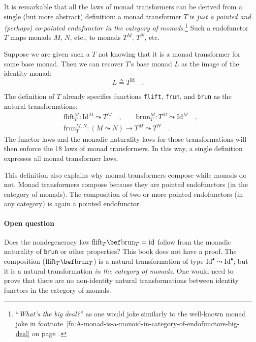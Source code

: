 It is remarkable that all the laws of monad transformers can be derived
from a single (but more abstract) definition: a monad transformer
$T$ is \emph{just a pointed and (perhaps) co-pointed endofunctor
in the category of monads}.\footnote{\textsf{``}\emph{What\textsf{'}s the big deal?}\textsf{''} as one\label{fn:Whats-the-big-deal-monad-transformers}
would joke similarly to the well-known monad joke in
footnote~\ref{fn:A-monad-is-a-monoid-in-category-of-endofunctors-big-deal}
on page~\pageref{fn:A-monad-is-a-monoid-in-category-of-endofunctors-big-deal}. } Such a endofunctor $T$ maps monads $M$, $N$, etc., to monads $T^{M}$,
$T^{N}$, etc. 

Suppose we are given such a $T$ not knowing that it is a monad transformer
for some base monad. Then we can recover $T$\textsf{'}s base monad $L$ as
the image of the identity monad:
\[
L\triangleq T^{\text{Id}}\quad.
\]

The definition of $T$ already specifies functions \lstinline!flift!,
\lstinline!frun!, and \lstinline!brun! as the natural transformations:
\begin{align*}
 & \text{flift}_{T}^{M}:\text{Id}^{M}\leadsto T^{M}\quad,\quad\quad\text{brun}_{T}^{M}:T^{M}\leadsto\text{Id}^{M}\quad,\\
 & \text{frun}_{T}^{M,N}:(M\leadsto N)\rightarrow T^{M}\leadsto T^{N}\quad.
\end{align*}
The functor laws and the monadic naturality laws for those transformations
will then enforce the 18 laws of monad transformers. In this way,
a single definition expresses all monad transformer laws.

This definition also explains why monad transformers compose while
monads do not. Monad transformers compose because they are pointed
endofunctors (in the category of monads). The composition of two or
more pointed endofunctors (in any category) is again a pointed endofunctor.

\paragraph{Open question\texttt{ }}

\label{par:Open-question-monad-id-trans}Does the nondegeneracy law
$\text{flift}_{T}\bef\text{brun}_{T}=\text{id}$ follow from the monadic
naturality of \lstinline!brun! or other properties? This book does
not have a proof. The composition ($\text{flift}_{T}\bef\text{brun}_{T}$)
is a natural transformation of type $\text{Id}^{\bullet}\leadsto\text{Id}^{\bullet}$;
but it is a natural transformation \emph{in the category of monads}.
One would need to prove that there are no non-identity natural transformations
between identity functors in the category of monads.

